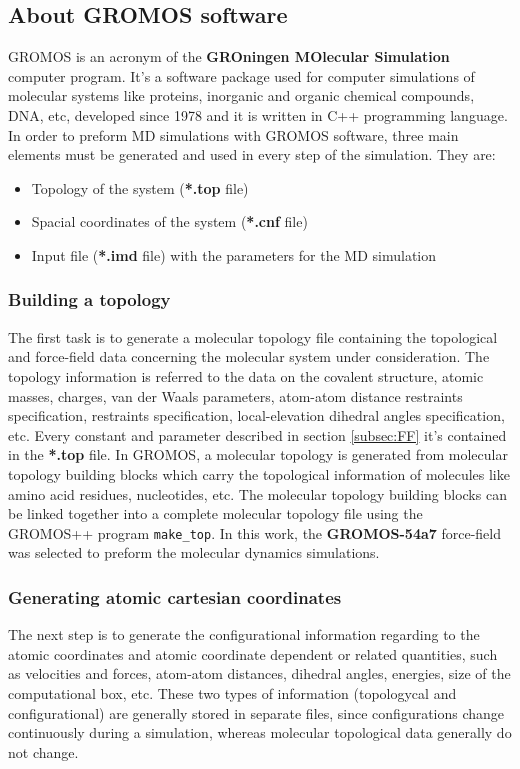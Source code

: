 \subsection{About GROMOS software}\label{subsec:about_}
GROMOS is an acronym of the \textbf{GROningen MOlecular Simulation} computer program. It's a software package used for computer simulations of molecular systems like proteins, inorganic and organic chemical compounds, DNA, etc, developed since 1978 and it is written in C++ programming language.
In order to preform MD simulations with GROMOS software, three main elements must be generated and used in every step of the simulation. They are:
\begin{itemize}
    \item Topology of the system (\textbf{*.top} file)
    \item Spacial coordinates of the system (\textbf{*.cnf} file)
    \item Input file (\textbf{*.imd} file) with the parameters for the MD simulation
\end{itemize}

\subsubsection{Building a topology}
The first task is to generate a molecular topology file containing the topological and force-field data concerning the molecular system under consideration. The topology information is referred to the data on the covalent structure, atomic masses, charges, van der Waals parameters, atom-atom distance restraints specification, restraints specification, local-elevation dihedral angles specification, etc. Every constant and parameter described in section \ref{subsec:FF} it's contained in the \textbf{*.top} file. In GROMOS, a molecular topology is generated from molecular topology building blocks which carry the topological information of molecules like amino acid residues, nucleotides, etc. The molecular topology
building blocks can be linked together into a complete molecular topology file using the GROMOS++ program \texttt{make\_top}. In this work, the \textbf{GROMOS-54a7} force-field was selected to preform the molecular dynamics simulations. 

\subsubsection{Generating atomic cartesian coordinates}
The next step is to generate the configurational information regarding to the atomic coordinates and atomic coordinate dependent or related quantities, such as velocities and forces, atom-atom distances, dihedral angles, energies, size of the computational box, etc. These two types of information (topologycal and configurational) are generally stored in separate files, since configurations change continuously during a simulation, whereas molecular topological data generally do not change.

